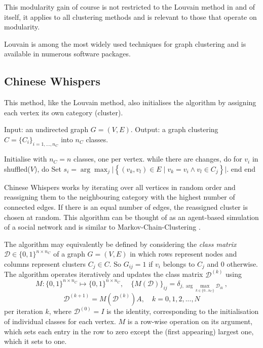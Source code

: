 \documentclass[12pt, a4paper]{article}
\begin{document}
  This modularity gain of course is not restricted to the Louvain method in and of itself, it applies to all clustering methods and is relevant to those that operate on modularity.

  Louvain is among the most widely used techniques for graph clustering and is available in numerous software packages.

  \subsection{Chinese Whispers}
  This method, like the Louvain method, also initialises the algorithm by assigning each vertex its own category (cluster).

  \begin{algorithm}[language=pseudo, caption={\centering The \textit{Chinese Whispers} algorithm due to \cite{cw-biemann}}]
Input: an undirected graph $G = (V, E)$.
Output: a graph clustering $C = \{C_i\}_{i=1, ..., n_C}$ into $n_C$ classes.

Initialise with $n_C = n$ classes, one per vertex.
while there are changes, do
  for $v_i$ in shuffled($V$), do
    Set $s_i = \arg\max_{j} \big|\left\{(v_k, v_l) \in E \;|\; v_k = v_i \wedge v_l \in C_j\right\}\big|$.
  end
end
  \end{algorithm}

  Chinese Whispers works by iterating over all vertices in random order and reassigning them to the neighbouring category with the highest number of connected edges. If there is an equal number of edges, the reassigned cluster is chosen at random.
  This algorithm can be thought of as an agent-based simulation of a social network \parencite{cw-biemann} and is similar to Markov-Chain-Clustering \parencite{van-dongen, fortunato}.

  The algorithm may equivalently be defined by considering the \textit{class matrix} $\mathcal{D} \in \{0, 1\}^{n \times n_C}$ of a graph $G = (V, E)$ in which rows represent nodes and columns represent clusters $C_j \in C$.
  So $G_{ij} = 1$ if $v_i$ belongs to $C_j$ and $0$ otherwise.
  The algorithm operates iteratively and updates the class matrix $\mathcal{D}^{(k)}$ using
  $$M: \{0, 1\}^{n \times n_C} \mapsto \{0, 1\}^{n \times n_C}, \quad \{M(\mathcal{D})\}_{ij} = \delta_{j,\arg\max_{k\in \{0...n_C\}} \mathcal{D}_{ik}}\,,$$
  $$\mathcal{D}^{(k+1)} = M(\mathcal{D}^{(k)}) A, \quad k = 0, 1, 2, ..., N$$
  per iteration $k$, where $\mathcal{D}^{(0)} = I$ is the identity, corresponding to the initialisation of individual classes for each vertex.
  $M$ is a row-wise operation on its argument, which sets each entry in the row to zero except the (first appearing) largest one, which it sets to one.
\end{document}
